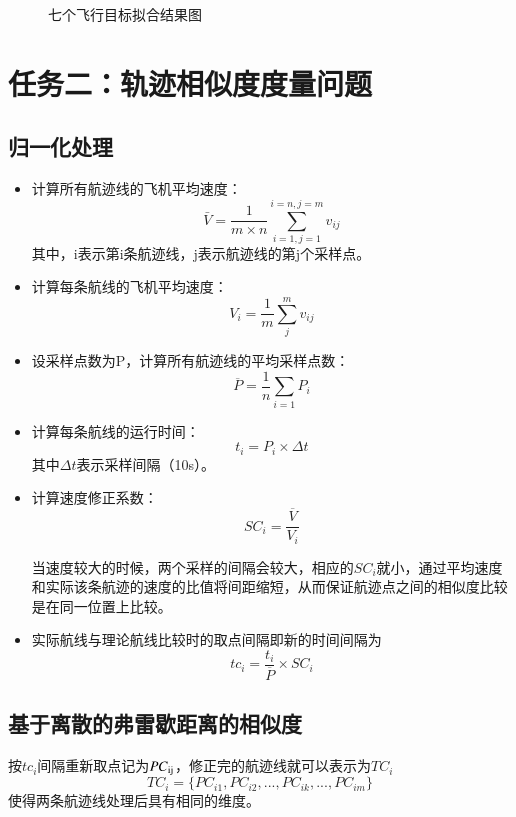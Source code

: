 \documentclass[GBK]{ctexart}
\begin{document}
\begin{spacing}{1.5}
\begin{figure}[H]
  \caption{七个飞行目标拟合结果图}\label{quantinihe}
\end{figure}

\section{任务二：轨迹相似度度量问题}
\subsection{归一化处理}
\begin{itemize}
  \item 计算所有航迹线的飞机平均速度：
  \begin{equation}
\bar V = \frac{1}{{m \times n}}\sum\limits_{i = 1,j = 1}^{i = n,j = m} {{v_{ij}}}
\end{equation}其中，i表示第i条航迹线，j表示航迹线的第j个采样点。
  \item 计算每条航线的飞机平均速度：
   \begin{equation}
{V_i} = \frac{1}{m}\sum\limits_j^m {{v_{ij}}}
\end{equation}
  \item 设采样点数为P，计算所有航迹线的平均采样点数：
  \begin{equation}
\overline P  = \frac{1}{n}\sum\limits_{i = 1} {{P_i}}
\end{equation}
  \item 计算每条航线的运行时间：
  \begin{equation}
{t_i} = {P_i} \times \Delta t
\end{equation}其中$\Delta t$表示采样间隔（10s）。
  \item 计算速度修正系数：
  \begin{equation}
S{C_i} = \frac{{\overline V }}{{{V_i}}}
\end{equation}

  当速度较大的时候，两个采样的间隔会较大，相应的$S{C_i}$就小，通过平均速度和实际该条航迹的速度的比值将间距缩短，从而保证航迹点之间的相似度比较是在同一位置上比较。
  \item 实际航线与理论航线比较时的取点间隔即新的时间间隔为
  \begin{equation}
    t{c_i} = \frac{{{t_i}}}{{\overline P }} \times S{C_i}
\end{equation}
\end{itemize}
\subsection{基于离散的弗雷歇距离的相似度}%
按$t{c_i}$间隔重新取点记为$P{C_{{\rm{ij}}}}$，修正完的航迹线就可以表示为$T{C_i}$
\begin{equation}
    T{C_i} = \{ P{C_{i1}},P{C_{i2}},...,P{C_{ik}},...,P{C_{im}}\}
\end{equation}
使得两条航迹线处理后具有相同的维度。


\end{spacing}
\end{document}
